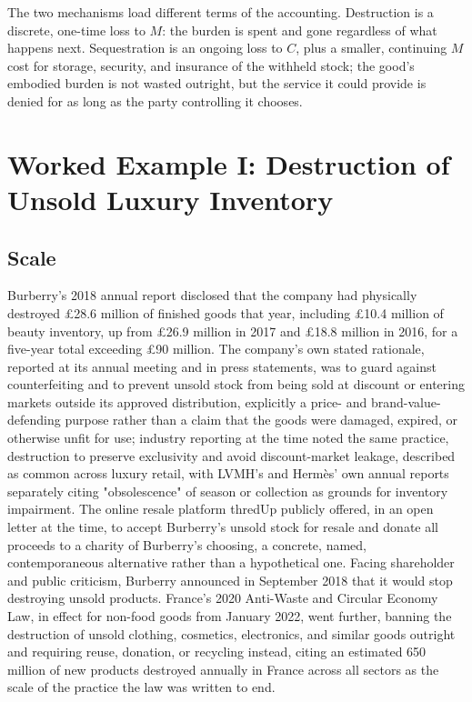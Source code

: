 \documentclass[11pt]{article}
\begin{document}
The two mechanisms load different terms of the accounting. Destruction is a discrete, one-time loss to $M$: the burden is spent and gone regardless of what happens next. Sequestration is an ongoing loss to $C$, plus a smaller, continuing $M$ cost for storage, security, and insurance of the withheld stock; the good's embodied burden is not wasted outright, but the service it could provide is denied for as long as the party controlling it chooses.

\section{Worked Example I: Destruction of Unsold Luxury Inventory}

\subsection{Scale}

Burberry's 2018 annual report disclosed that the company had physically destroyed £28.6 million of finished goods that year, including £10.4 million of beauty inventory, up from £26.9 million in 2017 and £18.8 million in 2016, for a five-year total exceeding £90 million. The company's own stated rationale, reported at its annual meeting and in press statements, was to guard against counterfeiting and to prevent unsold stock from being sold at discount or entering markets outside its approved distribution, explicitly a price- and brand-value-defending purpose rather than a claim that the goods were damaged, expired, or otherwise unfit for use; industry reporting at the time noted the same practice, destruction to preserve exclusivity and avoid discount-market leakage, described as common across luxury retail, with LVMH's and Herm\`es' own annual reports separately citing "obsolescence" of season or collection as grounds for inventory impairment. The online resale platform thredUp publicly offered, in an open letter at the time, to accept Burberry's unsold stock for resale and donate all proceeds to a charity of Burberry's choosing, a concrete, named, contemporaneous alternative rather than a hypothetical one. Facing shareholder and public criticism, Burberry announced in September 2018 that it would stop destroying unsold products. France's 2020 Anti-Waste and Circular Economy Law, in effect for non-food goods from January 2022, went further, banning the destruction of unsold clothing, cosmetics, electronics, and similar goods outright and requiring reuse, donation, or recycling instead, citing an estimated \texteuro{}650 million of new products destroyed annually in France across all sectors as the scale of the practice the law was written to end.
\end{document}
